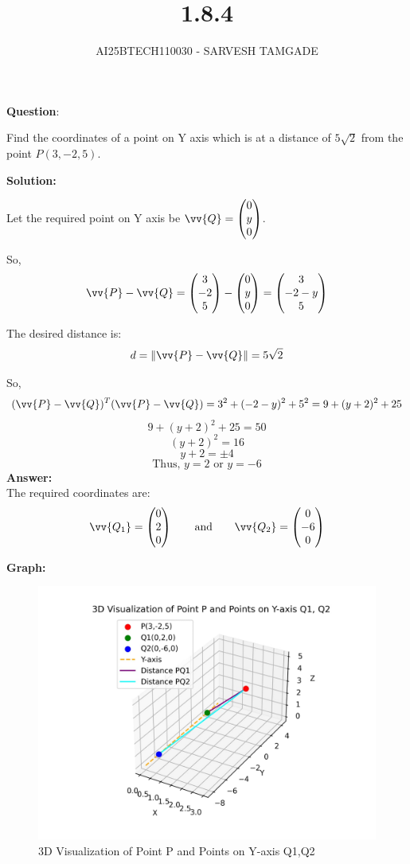 \documentclass[journal,12pt,onecolumn]{IEEEtran}
\title{1.8.4}
\author{AI25BTECH110030 - SARVESH TAMGADE}
\renewcommand{\vec}{\vv}
\begin{document}
{\let\newpage\relax\maketitle}

\textbf{Question}:

Find the coordinates of a point on Y axis which is at a distance of \( 5\sqrt{2} \) from the point \( P(3, -2, 5) \).

\textbf{Solution:}

Let the required point on Y axis be \(\vec{Q} = \begin{pmatrix}0 \\ y \\ 0\end{pmatrix}\).

So,
\[
\vec{P} - \vec{Q} = 
\begin{pmatrix} 3 \\ -2 \\ 5 \end{pmatrix} - 
\begin{pmatrix} 0 \\ y \\ 0 \end{pmatrix} = 
\begin{pmatrix} 3 \\ -2 - y \\ 5 \end{pmatrix}
\]

The desired distance is:
\[
d = \|\vec{P} - \vec{Q}\| = 5\sqrt{2}
\]

So,
\[
(\vec{P} - \vec{Q})^T (\vec{P} - \vec{Q}) = 3^2 + (-2 - y)^2 + 5^2 = 9 + (y + 2)^2 + 25
\]
\[
9 + (y+2)^2 + 25 = 50
\]
\[
(y+2)^2 = 16
\]
\[
y + 2 = \pm 4
\]
\[
\text{Thus, } y = 2 \text{ or } y = -6
\]
\vspace{2mm}
\textbf{Answer:}
\\
The required coordinates are:
\[
\vec{Q_1} = \myvec{0 \\ 2 \\ 0} \qquad \text{and} \qquad \vec{Q_2} = \myvec{0 \\ -6 \\ 0}
\]


\textbf{Graph:}
\begin{figure}[H]
	\centering
	\includegraphics[width=0.8\columnwidth]{FIG/graph.png}
	\caption{3D Visualization of Point P and Points on Y-axis Q1,Q2}
	\label{img}
\end{figure}
\end{document}
